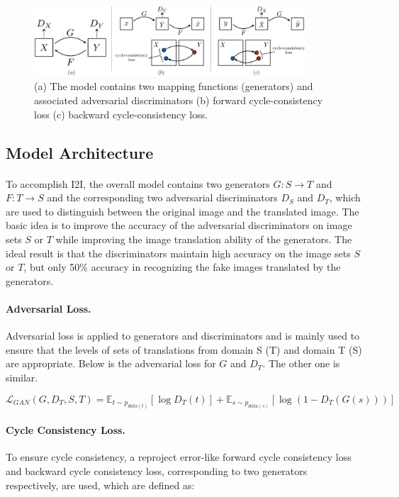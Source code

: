 \begin{figure}[!ht]
    \centering
    \includegraphics[width=0.9\textwidth]{Section2/cycleGAN.png}
    \caption{(a) The model contains two mapping functions (generators) and associated adversarial discriminators (b) forward cycle-consistency loss (c) backward cycle-consistency loss.}\label{figure:cyclegan}
\end{figure}

\subsection{Model Architecture}
\paragraph{}
To accomplish I2I, the overall model contains two generators $G: S \rightarrow T$ and $F: T \rightarrow S$ and the corresponding two adversarial discriminators $D_S$ and $D_T$, which are used to distinguish between the original image and the translated image. The basic idea is to improve the accuracy of the adversarial discriminators on image sets $S$ or $T$ while improving the image translation ability of the generators. The ideal result is that the discriminators maintain high accuracy on the image sets $S$ or $T$, but only 50\% accuracy in recognizing the fake images translated by the generators.

\paragraph{Adversarial Loss.}Adversarial loss is applied to generators and discriminators and is mainly used to ensure that the levels of sets of translations from domain S (T) and domain T (S)  are appropriate. Below is the adversarial loss for $G$ and $D_T$. The other one is similar.

\begin{equation}
    \mathcal{L}_{GAN}(G,D_T,S,T) = \mathbb{E}_{t \sim p_{data(t)}}[\log D_T(t)] + \mathbb{E}_{s \sim p_{data(s)}}[\log(1 - D_T(G(s)))]
\end{equation}

\paragraph{Cycle Consistency Loss.} 
To ensure cycle consistency, a reproject error-like forward cycle consistency loss and backward cycle consistency loss, corresponding to two generators respectively, are used, which are defined as:

